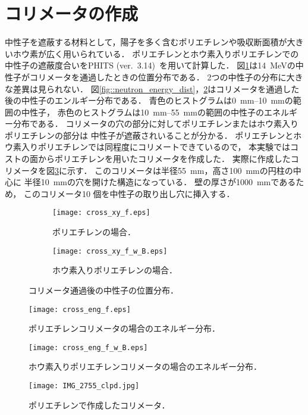 \documentclass[../master]{subfiles}
\begin{document}
\section{コリメータの作成}
中性子を遮蔽する材料として，陽子を多く含むポリエチレンや吸収断面積が大きいホウ素が広く用いられている．
ポリエチレンとホウ素入りポリエチレンでの中性子の遮蔽度合いをPHITS (ver.~3.14)~\cite{phits}を用いて計算した．
図\ref{collimator_xy_pos}は\SI{14}{\mega\electronvolt}の中性子がコリメータを通過したときの位置分布である．
2つの中性子の分布に大きな差異は見られない．
図\ref{fig::neutron_energy_dist}，\ref{fig::neutron_energy_dist_w_B}はコリメータを通過した後の中性子のエンルギー分布である．
青色のヒストグラムは\SIrange{0}{10}{\milli\metre}の範囲の中性子，
赤色のヒストグラムは\SIrange{10}{55}{\milli\metre}の範囲の中性子のエネルギー分布である．
コリメータの穴の部分に対してポリエチレンまたはホウ素入りポリエチレンの部分は
中性子が遮蔽されいることが分かる．
ポリエチレンとホウ素入りポリエチレンでは同程度にコリメートできているので，
本実験ではコストの面からポリエチレンを用いたコリメータを作成した．
実際に作成したコリメータを図\ref{pic::collimator}に示す．
このコリメータは半径\SI{55}{\milli\metre}，高さ\SI{100}{\milli\metre}の円柱の中心に
半径\SI{10}{\milli\metre}の穴を開けた構造になっている．
壁の厚さが\SI{1000}{\milli\metre}であるため，
このコリメータ10 個を中性子の取り出し穴に挿入する．
\begin{figure}
  \centering
  \begin{subfigure}{0.45\columnwidth}
    \centering
    \texttt{[image: cross\_xy\_f.eps]}
    \caption{ポリエチレンの場合．}
  \end{subfigure}
  \begin{subfigure}{0.45\columnwidth}
    \centering
    \texttt{[image: cross\_xy\_f\_w\_B.eps]}
    \caption{ホウ素入りポリエチレンの場合．}
  \end{subfigure}
  \caption{コリメータ通過後の中性子の位置分布．}
  \label{collimator_xy_pos}
\end{figure}
\begin{figure}
  \centering
  \texttt{[image: cross\_eng\_f.eps]}
  \caption{ポリエチレンコリメータの場合のエネルギー分布．}
  \label{fig::neutron_energy_dist}
  \centering
  \texttt{[image: cross\_eng\_f\_w\_B.eps]}
  \caption{ホウ素入りポリエチレンコリメータの場合のエネルギー分布．}
  \label{fig::neutron_energy_dist_w_B}
\end{figure}
\begin{figure}
  \centering
  \texttt{[image: IMG\_2755\_clpd.jpg]}
  \caption{ポリエチレンで作成したコリメータ．}
  \label{pic::collimator}
\end{figure}
\end{document}

